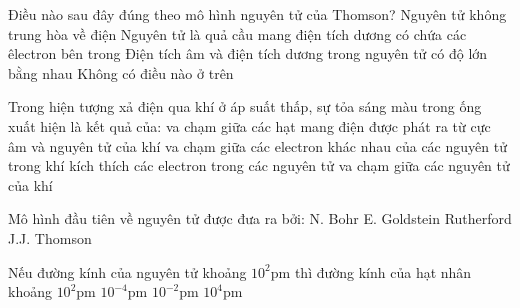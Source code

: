 \begin{ex}[2]
	Điều nào sau đây đúng theo mô hình nguyên tử của Thomson?
	\choice
	{%
		Nguyên tử không trung hòa về điện
	}
	{%
		\True Nguyên tử là quả cầu mang điện tích dương có chứa các êlectron bên trong
	}
	{%
		Điện tích âm và điện tích dương trong nguyên tử có độ lớn bằng nhau
	}
	{%
		Không có điều nào ở trên
	}
	\sodongkeex[5]
\end{ex}


\begin{ex}[3]
	Trong hiện tượng xả điện qua khí ở áp suất thấp, sự tỏa sáng màu trong ống xuất hiện là kết quả của:
	\choice
	{%
		\True va chạm giữa các hạt mang điện được phát ra từ cực âm và nguyên tử của khí
	}
	{%
		va chạm giữa các electron khác nhau của các nguyên tử trong khí
	}
	{%
		kích thích các electron trong các nguyên tử
	}	
	{%
		va chạm giữa các nguyên tử của khí
	}	
	\sodongkeex[5]	
\end{ex}

\begin{ex}[2]
	Mô hình đầu tiên về nguyên tử được đưa ra bởi:
	\choice
	{%
		N. Bohr
	}
	{%
		E. Goldstein
	}
	{%
		Rutherford
	}
	{%
		\True J.J. Thomson
	}
	\sodongkeex[5]
\end{ex}

\begin{ex}[2]
	Nếu đường kính của nguyên tử khoảng $10^2 \mathrm{pm}$ thì đường kính của hạt nhân khoảng
	\choice
	{%
		$10^2 \mathrm{pm}$
	}
	{%
		$10^{-4} \mathrm{pm}$
	}
	{%
		\True	$10^{-2} \mathrm{pm}$
	}
	{
		$10^4 \mathrm{pm}$
	}
	\sodongkeex[5]
\end{ex}


